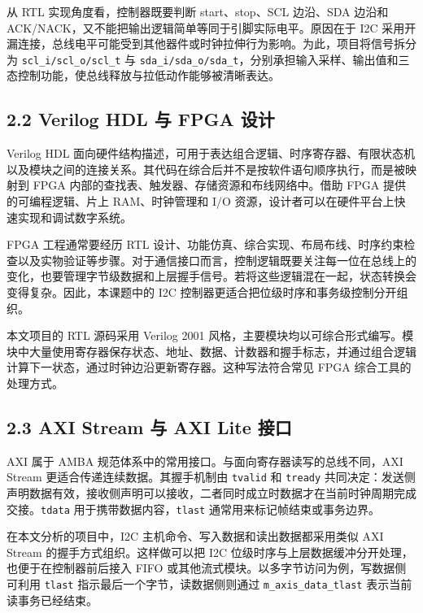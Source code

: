从 RTL 实现角度看，控制器既要判断 start、stop、SCL 边沿、SDA 边沿和
ACK/NACK，又不能把输出逻辑简单等同于引脚实际电平。原因在于 I2C
采用开漏连接，总线电平可能受到其他器件或时钟拉伸行为影响。为此，项目将信号拆分为
\texttt{scl\_i/scl\_o/scl\_t} 与
\texttt{sda\_i/sda\_o/sda\_t}，分别承担输入采样、输出值和三态控制功能，使总线释放与拉低动作能够被清晰表达。

\subsection{2.2 Verilog HDL 与 FPGA
设计}\label{verilog-hdl-ux4e0e-fpga-ux8bbeux8ba1}

Verilog HDL
面向硬件结构描述，可用于表达组合逻辑、时序寄存器、有限状态机以及模块之间的连接关系。其代码在综合后并不是按软件语句顺序执行，而是被映射到
FPGA 内部的查找表、触发器、存储资源和布线网络中。借助 FPGA
提供的可编程逻辑、片上 RAM、时钟管理和 I/O
资源，设计者可以在硬件平台上快速实现和调试数字系统。

FPGA 工程通常要经历 RTL
设计、功能仿真、综合实现、布局布线、时序约束检查以及实物验证等步骤。对于通信接口而言，控制逻辑既要关注每一位在总线上的变化，也要管理字节级数据和上层握手信号。若将这些逻辑混在一起，状态转换会变得复杂。因此，本课题中的
I2C 控制器更适合把位级时序和事务级控制分开组织。

本文项目的 RTL 源码采用 Verilog 2001
风格，主要模块均以可综合形式编写。模块中大量使用寄存器保存状态、地址、数据、计数器和握手标志，并通过组合逻辑计算下一状态，通过时钟边沿更新寄存器。这种写法符合常见
FPGA 综合工具的处理方式。

\subsection{2.3 AXI Stream 与 AXI Lite
接口}\label{axi-stream-ux4e0e-axi-lite-ux63a5ux53e3}

AXI 属于 AMBA 规范体系中的常用接口。与面向寄存器读写的总线不同，AXI
Stream 更适合传递连续数据。其握手机制由 \texttt{tvalid} 和
\texttt{tready}
共同决定：发送侧声明数据有效，接收侧声明可以接收，二者同时成立时数据才在当前时钟周期完成交接。\texttt{tdata}
用于携带数据内容，\texttt{tlast} 通常用来标记帧结束或事务边界。

在本文分析的项目中，I2C 主机命令、写入数据和读出数据都采用类似 AXI
Stream 的握手方式组织。这样做可以把 I2C
位级时序与上层数据缓冲分开处理，也便于在控制器前后接入 FIFO
或其他流式模块。以多字节访问为例，写数据侧可利用 \texttt{tlast}
指示最后一个字节，读数据侧则通过 \texttt{m\_axis\_data\_tlast}
表示当前读事务已经结束。

